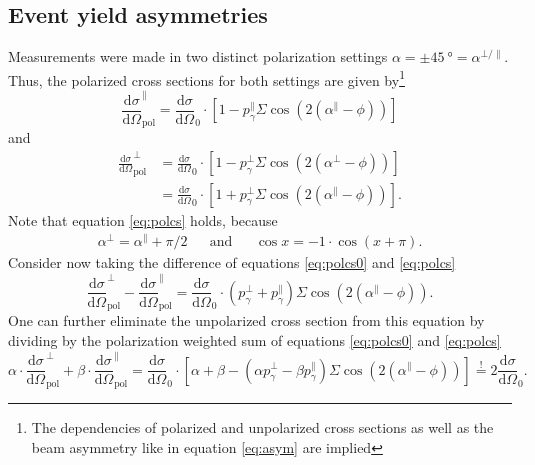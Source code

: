 \subsection{Event yield asymmetries}
Measurements were made in two distinct polarization settings $\alpha=\pm\SI{45}{\degree}=\alpha^{\bot/\parallel}$. Thus, the polarized cross sections for both settings are given by\footnote{The dependencies of polarized and unpolarized cross sections as well as the beam asymmetry like in equation \eqref{eq:asym} are implied}
\begin{equation}
	\frac{\text{d}\sigma}{\text{d}\Omega}_\text{pol}^\parallel=\frac{\text{d}\sigma}{\text{d}\Omega}_0\cdot\left[1-p_\gamma^\parallel\Sigma\cos\left(2\left(\alpha^\parallel-\phi\right)\right)\right]
	\label{eq:polcs0}
\end{equation}
and 
\begin{align}
	\frac{\text{d}\sigma}{\text{d}\Omega}_\text{pol}^\bot&=\frac{\text{d}\sigma}{\text{d}\Omega}_0\cdot\left[1-p_\gamma^\bot\Sigma\cos\left(2\left(\alpha^\bot-\phi\right)\right)\right]\label{eq:polcs00}\\
	&=\frac{\text{d}\sigma}{\text{d}\Omega}_0\cdot\left[1+p_\gamma^\bot\Sigma\cos\left(2\left(\alpha^\parallel-\phi\right)\right)\right].\label{eq:polcs}
\end{align}
Note that equation \eqref{eq:polcs} holds, because 
\begin{align*}
	\alpha^\bot=\alpha^\parallel+\pi/2 &&\text{and}&&\cos x = -1\cdot\cos(x+\pi).
\end{align*}
Consider now taking the difference of equations \eqref{eq:polcs0} and \eqref{eq:polcs}
\begin{equation}
	\frac{\text{d}\sigma}{\text{d}\Omega}_\text{pol}^\bot-\frac{\text{d}\sigma}{\text{d}\Omega}_\text{pol}^\parallel=\frac{\text{d}\sigma}{\text{d}\Omega}_0\cdot\left(p_\gamma^\bot+p_\gamma^\parallel\right)\Sigma\cos\left(2\left(\alpha^\parallel-\phi\right)\right).
\end{equation}
One can further eliminate the unpolarized cross section from this equation by dividing by the polarization weighted sum of equations \eqref{eq:polcs0} and \eqref{eq:polcs}
\begin{equation}
	\alpha\cdot\frac{\text{d}\sigma}{\text{d}\Omega}_\text{pol}^\bot+\beta\cdot\frac{\text{d}\sigma}{\text{d}\Omega}_\text{pol}^\parallel=\frac{\text{d}\sigma}{\text{d}\Omega}_0\cdot\left[\alpha+\beta-\left(\alpha p_\gamma^\bot-\beta p_\gamma^\parallel\right)\Sigma\cos\left(2\left(\alpha^\parallel-\phi\right)\right)\right]\overset{!}{=}2\frac{\text{d}\sigma}{\text{d}\Omega}_0.
\end{equation}
